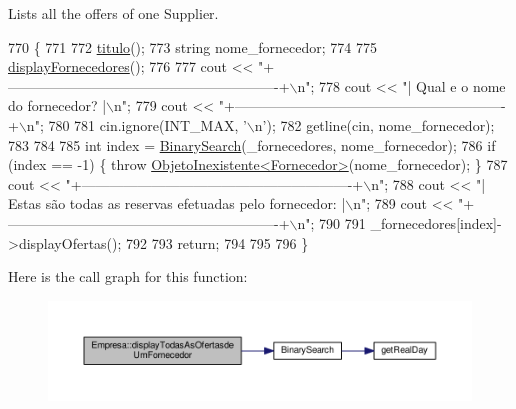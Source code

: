 Lists all the offers of one Supplier. 


\begin{DoxyCode}
770                                                   \{
771 
772     \hyperlink{classEmpresa_ad79f7196a8ce7256771cbd7b9542155c}{titulo}();
773     \textcolor{keywordtype}{string} nome\_fornecedor;
774 
775     \hyperlink{classEmpresa_a55c3756c01b45b41ad03f4e4f3e4dcac}{displayFornecedores}();
776 
777     cout << \textcolor{stringliteral}{"+----------------------------------------------------------+\(\backslash\)n"};
778     cout << \textcolor{stringliteral}{"| Qual e o nome do fornecedor?                                |\(\backslash\)n"};
779     cout << \textcolor{stringliteral}{"+----------------------------------------------------------+\(\backslash\)n"};
780 
781     cin.ignore(INT\_MAX, \textcolor{charliteral}{'\(\backslash\)n'});
782     getline(cin, nome\_fornecedor);
783 
784 
785     \textcolor{keywordtype}{int} index = \hyperlink{extras_8h_abc85c93edf561168b5bbee8054caa388}{BinarySearch}(\_fornecedores, nome\_fornecedor);
786     \textcolor{keywordflow}{if} (index == -1) \{ \textcolor{keywordflow}{throw} \hyperlink{classObjetoInexistente}{ObjetoInexistente<Fornecedor>}(nome\_fornecedor); \}
787     cout << \textcolor{stringliteral}{"+----------------------------------------------------------+\(\backslash\)n"};
788     cout << \textcolor{stringliteral}{"| Estas são todas as reservas efetuadas pelo fornecedor:      |\(\backslash\)n"};
789     cout << \textcolor{stringliteral}{"+----------------------------------------------------------+\(\backslash\)n"};
790 
791     \_fornecedores[index]->displayOfertas();
792 
793     \textcolor{keywordflow}{return};
794 
795 
796 \}
\end{DoxyCode}


Here is the call graph for this function\+:
\nopagebreak
\begin{figure}[H]
\begin{center}
\leavevmode
\includegraphics[width=350pt]{classEmpresa_a73543b5ca1d9dd8e99e75d9167839471_cgraph}
\end{center}
\end{figure}


